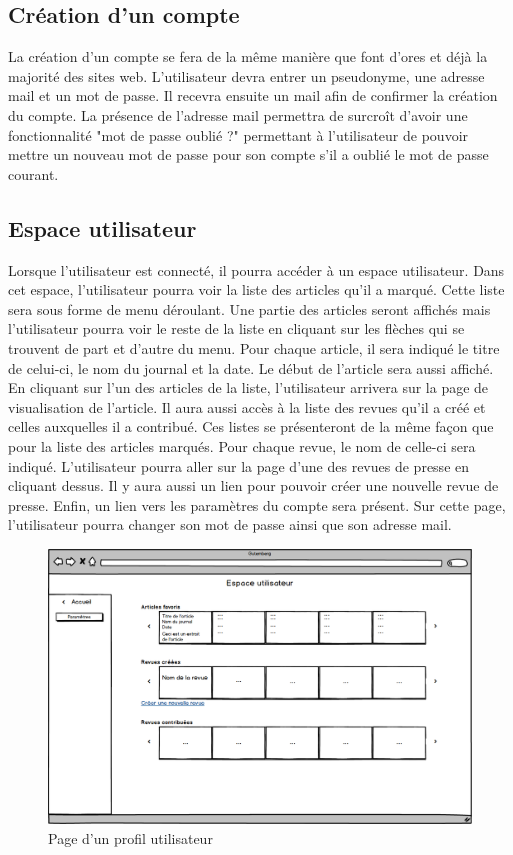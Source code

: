 \subsection{Création d'un compte}
\label{creation_compte}


La création d'un compte se fera de la même manière que font d'ores et déjà la majorité des sites web. L'utilisateur devra entrer un pseudonyme, une adresse mail et un mot de passe. Il recevra ensuite un mail afin de confirmer la création du compte. La présence de l'adresse mail permettra de surcroît d'avoir une fonctionnalité "mot de passe oublié ?" permettant à l'utilisateur de pouvoir mettre un nouveau mot de passe pour son compte s'il a oublié le mot de passe courant.


\subsection{Espace utilisateur}
\label{espace_util}

Lorsque l'utilisateur est connecté, il pourra accéder à un espace utilisateur. Dans cet espace, l'utilisateur pourra voir la liste des articles qu'il a marqué. Cette liste sera sous forme de menu déroulant. Une partie des articles seront affichés mais l'utilisateur pourra voir le reste de la liste en cliquant sur les flèches qui se trouvent de part et d'autre du menu. Pour chaque article, il sera indiqué le titre de celui-ci, le nom du journal et la date. Le début de l'article sera aussi affiché. En cliquant sur l'un des articles de la liste, l'utilisateur arrivera sur la page de visualisation de l'article.
Il aura aussi accès à la liste des revues qu'il a créé et celles auxquelles il a contribué. Ces listes se présenteront de la même façon que pour la liste des articles marqués. Pour chaque revue, le nom de celle-ci sera indiqué. L'utilisateur pourra aller sur la page d'une des revues de presse en cliquant dessus.
Il y aura aussi un lien pour pouvoir créer une nouvelle revue de presse. 
Enfin, un lien vers les paramètres du compte sera présent. Sur cette page, l'utilisateur pourra changer son mot de passe ainsi que son adresse mail.

    \begin{figure}[H]
        \centering
        \includegraphics[width=\textwidth]{figures/Utilisateur.png}
            \caption{Page d'un profil utilisateur}
            \label{fig:utilisateur}
    \end{figure}

